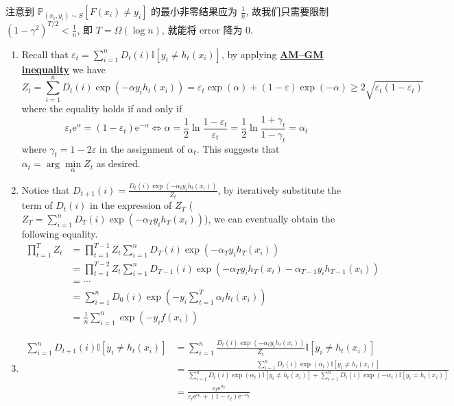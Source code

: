 \documentclass[8pt]{article}
\theoremstyle{compact}
\def\obj#1{\textbf{\uline{#1}}}
\def\ge{\geqslant}
\def\e{\mathrm{e}}
\begin{document}
注意到 $\mathbb P_{(x_i, y_i) \sim S} \left[F(x_i) \neq y_i\right]$ 的最小非零结果应为 $\frac1n$, 故我们只需要限制 $(1 - \gamma^2)^{T/2} < \frac1n$, 即 $T = \Omega(\log n)$, 就能将 error 降为 $0$.

\begin{enumerate}
	\item Recall that $\varepsilon_t = \sum\limits_{i=1}^{n}D_t(i)\mathbb I[y_i \neq h_t(x_i)]$, by applying \obj{AM–GM inequality} we have
	$$Z_t = \sum\limits_{i=1}^{n}D_t(i)\exp(-\alpha y_i h_t(x_i)) = \varepsilon_t \exp(\alpha) + (1 - \varepsilon)\exp(-\alpha) \ge 2\sqrt{\varepsilon_t(1 - \varepsilon_t)}$$
	where the equality holds if and only if $$\varepsilon_t \e^{\alpha} = (1 - \varepsilon_t)\e^{-\alpha} \Leftrightarrow \alpha = \frac12 \ln\frac{1 - \varepsilon_t}{\varepsilon_t} = \frac12 \ln\frac{1 + \gamma_t}{1 - \gamma_t} = \alpha_t$$
	where $\gamma_t = 1 - 2\varepsilon$ in the assignment of $\alpha_t$. This suggests that $\alpha_t = \arg\min\limits_{\alpha} Z_t$ as desired.

	\item Notice that $D_{t+1}(i) = \frac{D_t(i)\exp(-\alpha_t y_i h_t(x_i))}{Z_t}$, by iteratively substitute the term of $D_t(i)$ in the expression of $Z_T$ ($Z_T = \sum_{i=1}^{n}D_T(i)\exp(-\alpha_T y_i h_T(x_i))$), we can eventually obtain the following equality. \begin{equation*}
		\begin{split}
			\prod_{t=1}^{T}Z_t &= \prod_{t=1}^{T-1}Z_t \sum_{i=1}^{n}D_T(i)\exp(-\alpha_T y_i h_T(x_i))\\
			&= \prod_{t=1}^{T-2}Z_t \sum_{i=1}^{n}D_{T-1}(i)\exp(-\alpha_T y_i h_T(x_i) -\alpha_{T-1} y_i h_{T-1}(x_i))\\
			&= \cdots\\
			&= \sum\limits_{i=1}^{n}D_0(i)\exp\left(-y_i\sum\limits_{t=1}^{T}\alpha_t h_t(x_i)\right)\\
			&= \frac1n \sum\limits_{i=1}^{n}\exp\left(-y_if(x_i)\right)
		\end{split}
	\end{equation*}
	
	\item \begin{equation*}
		\begin{split}
			\sum_{i=1}^{n}D_{t+1}(i)\mathbb I[y_i \neq h_t(x_i)] &= \sum_{i=1}^{n}\frac{D_{t}(i)\exp(-\alpha_t y_i h_t(x_i))}{Z_t}\mathbb I[y_i \neq h_t(x_i)]\\
			&= \frac{\sum\limits_{i=1}^{n}D_{t}(i)\exp(\alpha_t)\mathbb I[y_i \neq h_t(x_i)]}{\sum\limits_{i=1}^{n}D_{t}(i)\exp(\alpha_t)\mathbb I[y_i \neq h_t(x_i)] + \sum\limits_{i=1}^{n}D_{t}(i)\exp(-\alpha_t)\mathbb I[y_i = h_t(x_i)]}\\
			&= \frac{\varepsilon_t \e^{\alpha_t}}{\varepsilon_t \e^{\alpha_t} + (1 - \varepsilon_t)\e^{-\alpha_t}}
		\end{split}
	\end{equation*}


\end{enumerate}
\end{document}
